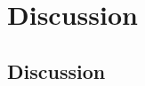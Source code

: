 \doublespacing %

\chapter{Discussion}
\label{ch4}

\begin{spacing}{1} %
\minitoc %
\end{spacing} %
\thesisspacing %


\section{Discussion}




